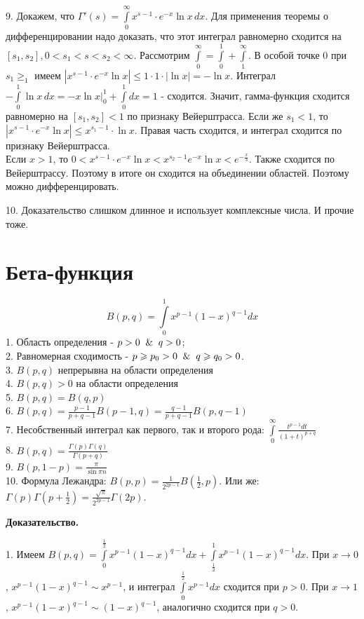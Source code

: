9. Докажем, что 
$\Gamma'(s)=\int\limits_{0}^{\infty}x^{s-1}\cdot e^{-x}\ln x\,dx$. Для 
применения теоремы о дифференцировании надо доказать,
что этот интеграл равномерно сходится на $[s_1,s_2],0<s_1<s<s_2<\infty$. 
Рассмотрим
$\int\limits_{0}^{\infty} = \int\limits_{0}^{1} + \int\limits_{1}^{\infty}$.
В особой точке 0 при $s_1\geqslant_1$ имеем
$|x^{s-1}\cdot e^{-x}\ln x|\leqslant 1\cdot 1\cdot |\ln x|=-\ln x$. 
Интеграл $-\int\limits_{0}^{1}\ln x\,dx=-x\ln x\big|^1_0+
\int\limits_{0}^{1}dx=1$ - сходится. Значит, гамма-функция сходится равномерно
на $[s_1,s_2]<1$ по признаку Вейерштрасса. Если же $s_1<1$, то
$|x^{s-1}\cdot e^{-x}\ln x|\leqslant x^{s_1-1}\cdot\ln x$. 
Правая часть сходится, и интеграл сходится по признаку Вейерштрасса.\\
Если $x>1$, то  $0<x^{s-1}\cdot e^{-x}\ln x<x^{s_2-1}e^{-x}\ln x
<e^{-\frac{x}{3}}$. Также сходится по Вейерштрассу. Поэтому в итоге он сходится
на объединении областей. Поэтому можно дифференцировать.

10. Доказательство слишком длинное и использует комплексные числа. И прочие 
тоже. 

\section{Бета-функция}
$$B(p,q)=\int\limits_{0}^{1} x^{p-1}(1-x)^{q-1}dx$$ 
1. Область определения - $p>0\And q>0$;\\
2. Равномерная сходимость -  $p\geqslant p_0>0\And q\geqslant q_0>0$.\\
3. $B(p,q)$ непрерывна на области определения\\
4. $B(p,q)>0$  на области определения\\
5. $B(p,q)=B(q,p)$\\ 
6. $B(p,q)=\frac{p-1}{p+q-1}B(p-1,q)=\frac{q-1}{p+q-1}B(p,q-1)$ \\
7. Несобственный интеграл как первого, так и второго рода:
$\int\limits_{0}^{\infty} \frac{t^{p-1}dt}{(1+t)^{p+q}}$\\
8. $\boxed{B(p,q)=\frac{\Gamma(p)\Gamma(q)}{\Gamma(p+q)}}$ \\
9. $B(p,1-p)=\frac{\pi}{\sin\pi n}$ \\
10. Формула Лежандра: $\boxed{B(p,p)=
\frac{1}{2^{2p-1}}B\left(\frac{1}{2},p\right)}$.
Или же: $\Gamma(p)\Gamma(p+\frac{1}{2})=\frac{\sqrt{\pi}}{2^{2p-1}}\Gamma(2p)$.

\textbf{Доказательство.}

1. Имеем  $B(p,q)=\int\limits_{0}^{\frac{1}{2}}x^{p-1}(1-x)^{q-1}dx+
\int\limits_{\frac{1}{2}}^{1}x^{p-1}(1-x)^{q-1}dx$. При $x\to 0$,
$x^{p-1}(1-x)^{q-1}\sim x^{p-1}$, и интеграл  $\int\limits_{0}^{\frac{1}{2}}
x^{p-1}dx$ сходится при $p>0$. При  $x\to 1$, 
$x^{p-1}(1-x)^{q-1}\sim(1-x)^{q-1}$, аналогично сходится при  $q>0$. 


